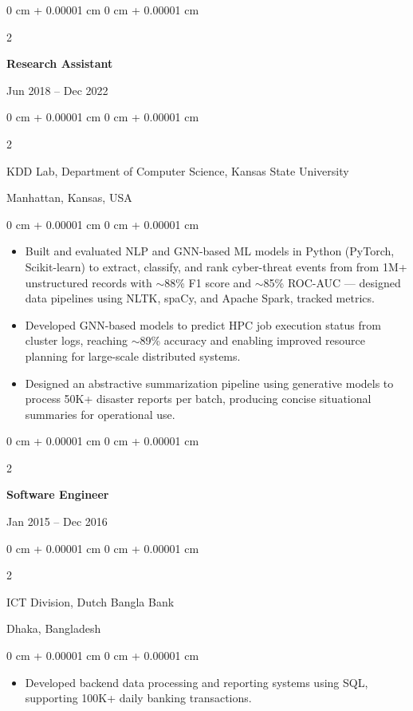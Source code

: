 \documentclass[10pt, letterpaper]{article}
\newenvironment{highlights}{
    \begin{itemize}[
        topsep=0.10 cm,
        parsep=0.10 cm,
        partopsep=0pt,
        itemsep=0pt,
        leftmargin=0 cm + 10pt
    ]
}{
    \end{itemize}
} %
\newenvironment{onecolentry}{
    \begin{adjustwidth}{
        0 cm + 0.00001 cm
    }{
        0 cm + 0.00001 cm
    }
}{
    \end{adjustwidth}
} %
\newenvironment{twocolentry}[2][]{
    \onecolentry
    \def\secondColumn{#2}
    \setcolumnwidth{\fill, 4.5 cm}
    \begin{paracol}{2}
}{
    \switchcolumn \raggedleft \secondColumn
    \end{paracol}
    \endonecolentry
} %
\begin{document}
    \vspace{1mm}

    \begin{twocolentry}{Jun 2018 -- Dec 2022}
        \textbf{Research Assistant}
    \end{twocolentry}
    \begin{twocolentry}{Manhattan, Kansas, USA}
       KDD Lab, Department of Computer Science, Kansas State University
    \end{twocolentry}
    \vspace{0.10 cm}
    \begin{onecolentry}
        \begin{highlights}
            \item Built and evaluated NLP and GNN-based ML models in Python (PyTorch, Scikit-learn) to extract, classify, and rank cyber-threat events from from 1M+ unstructured records with $\sim$88\% F1 score and $\sim$85\% ROC-AUC — designed data pipelines using NLTK, spaCy, and Apache Spark, tracked metrics.
            \item Developed GNN-based models to predict HPC job execution status from cluster logs, reaching $\sim$89\% accuracy and enabling improved resource planning for large-scale distributed systems.
            \item Designed an abstractive summarization pipeline using generative models to process 50K+ disaster reports per batch, producing concise situational summaries for operational use.
        \end{highlights}
    \end{onecolentry}

    \vspace{0.1 cm}
    \begin{twocolentry}{Jan 2015 -- Dec 2016}
        \textbf{Software Engineer}
    \end{twocolentry}
    \begin{twocolentry}{Dhaka, Bangladesh}
       ICT Division, Dutch Bangla Bank
    \end{twocolentry}

    \begin{onecolentry}
        \begin{highlights}
            \item Developed backend data processing and reporting systems using SQL, supporting 100K+ daily banking transactions.
        \end{highlights}
    \end{onecolentry}
\end{document}
